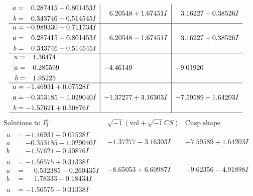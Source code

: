 \documentclass[1p]{elsarticle_modified}
\theoremstyle{definition}
\newcommand{\I}{\sqrt{-1}}
\begin{document}
$$\begin{array}{c|c|c}
\begin{aligned}
a &= \phantom{-}0.287415 - 0.801453 I \\
b &= \phantom{-}0.343746 - 0.514545 I\end{aligned}
 & \phantom{-}6.20548 + 1.67451 I & \phantom{-}3.16227 - 0.38526 I \\ \hline\begin{aligned}
u &= -0.989330 - 0.711734 I \\
a &= \phantom{-}0.287415 + 0.801453 I \\
b &= \phantom{-}0.343746 + 0.514545 I\end{aligned}
 & \phantom{-}6.20548 - 1.67451 I & \phantom{-}3.16227 + 0.38526 I \\ \hline\begin{aligned}
u &= \phantom{-}1.36474\phantom{ +0.000000I} \\
a &= \phantom{-}0.285599\phantom{ +0.000000I} \\
b &= \phantom{-}1.95225\phantom{ +0.000000I}\end{aligned}
 & -4.46149\phantom{ +0.000000I} & -9.01920\phantom{ +0.000000I} \\ \hline\begin{aligned}
u &= -1.46931 + 0.07528 I \\
a &= -0.353185 + 1.029040 I \\
b &= -1.57621 + 0.50876 I\end{aligned}
 & -1.37277 + 3.16303 I & -7.59589 - 1.64203 I\\
 \hline 
 \end{array}$$\newpage$$\begin{array}{c|c|c}  
\text{Solutions to }I^u_{3}& \I (\text{vol} + \sqrt{-1}CS) & \text{Cusp shape}\\
 \hline 
\begin{aligned}
u &= -1.46931 - 0.07528 I \\
a &= -0.353185 - 1.029040 I \\
b &= -1.57621 - 0.50876 I\end{aligned}
 & -1.37277 - 3.16303 I & -7.59589 + 1.64203 I \\ \hline\begin{aligned}
u &= -1.56575 + 0.31338 I \\
a &= \phantom{-}0.532385 - 0.260435 I \\
b &= \phantom{-}1.78333 - 0.18434 I\end{aligned}
 & -8.65053 + 6.60987 I & -9.62356 - 4.91898 I \\ \hline\begin{aligned}
u &= -1.56575 - 0.31338 I \\

\end{aligned}
\end{array}$$
\end{document}
